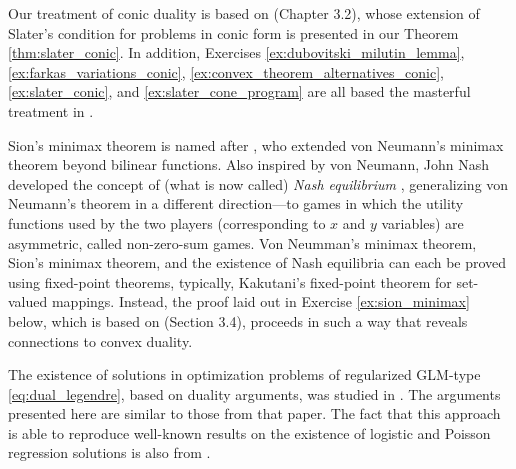Our treatment of conic duality is based on \cite{bental2023convex} (Chapter
3.2), whose extension of Slater's condition for problems in conic form is
presented in our Theorem \ref{thm:slater_conic}. In addition, Exercises
\ref{ex:dubovitski_milutin_lemma}, \ref{ex:farkas_variations_conic}, 
\ref{ex:convex_theorem_alternatives_conic}, \ref{ex:slater_conic}, and   
\ref{ex:slater_cone_program} are all based the masterful treatment in
\cite{bental2023convex}.  

Sion's minimax theorem is named after \cite{sion1958general}, who extended  
von Neumann's minimax theorem \cite{vonneumann1928theorie} beyond bilinear   
functions. Also inspired by von Neumann, John Nash developed the concept of
(what is now called) \emph{Nash equilibrium} \cite{nash1950equilibrium, 
  nash1951noncooperative}, generalizing von Neumann's theorem in a different   
direction---to games in which the utility functions used by the two players  
(corresponding to $x$ and $y$ variables) are asymmetric, called non-zero-sum
games. Von Neumman's minimax theorem, Sion's minimax theorem, and the existence
of Nash equilibria can each be proved using fixed-point theorems, typically,
Kakutani's fixed-point theorem \cite{kakutani1941generalization} for set-valued
mappings. Instead, the proof laid out in Exercise \ref{ex:sion_minimax} below, 
which is based on \cite{bental2023convex} (Section 3.4), proceeds in such a way
that reveals connections to convex duality.    

The existence of solutions in optimization problems of regularized GLM-type
\eqref{eq:dual_legendre}, based on duality arguments, was studied in
\cite{ali2019generalized}. The arguments presented here are similar to those
from that paper. The fact that this approach is able to reproduce well-known 
results on the existence of logistic and Poisson regression solutions
is also from \cite{ali2019generalized}.    

\clearpage

